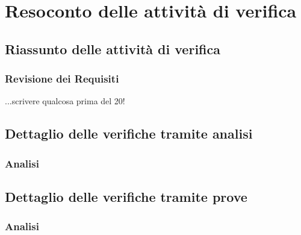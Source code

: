 \section{Resoconto delle attività di verifica}
	\subsection{Riassunto delle attività di verifica}
	\label{RiassuntoAttivitaVerifica}
	 	\subsubsection{Revisione dei Requisiti}
	 	...scrivere qualcosa prima del 20!
	 
	 \subsection{Dettaglio delle verifiche tramite analisi}
	 \label{DettaglioVerificheAnalisi}
	 	\subsubsection{Analisi}
	 	
	 \subsection{Dettaglio delle verifiche tramite prove}
		\subsubsection{Analisi}
	 
	 


	
